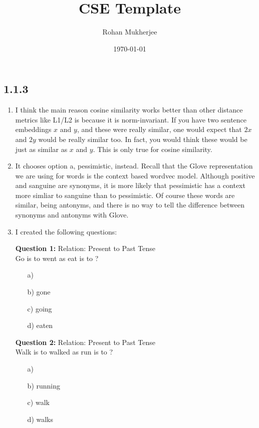 \documentclass[12pt]{article}
\title{CSE Template}
\date{\today}
\author{Rohan Mukherjee}
\theoremstyle{definitionstyle}
\begin{document}
    \maketitle
    \subsection*{1.1.3}
    \begin{enumerate}
        \item I think the main reason cosine similarity works better than other distance metrics like L1/L2 is because it is norm-invariant. If you have two sentence embeddings $x$ and $y$, and these were really similar, one would expect that $2x$ and $2y$ would be really similar too. In fact, you would think these would be just as similar as $x$ and $y$. This is only true for cosine similarity. 
        \item It chooses option a, pessimistic, instead. Recall that the Glove representation we are using for words is the context based wordvec model. Although positive and sanguine are synonyms, it is more likely that pessimistic has a context more simliar to sanguine than to pessimistic. Of course these words are similar, being antonyms, and there is no way to tell the difference between synonyms and antonyms with Glove. 
        \item I created the following questions:

        \textbf{Question 1:} Relation: Present to Past Tense \\
        Go is to went as eat is to \underline{\hspace{2cm}}?

        \begin{enumerate}
            \item[a)] 
            \item[b)] gone
            \item[c)] going
            \item[d)] eaten
        \end{enumerate}

        \textbf{Question 2:} Relation: Present to Past Tense \\
        Walk is to walked as run is to \underline{\hspace{2cm}}?

        \begin{enumerate}
            \item[a)] 
            \item[b)] running
            \item[c)] walk
            \item[d)] walks
        \end{enumerate}


\end{enumerate}
\end{document}
